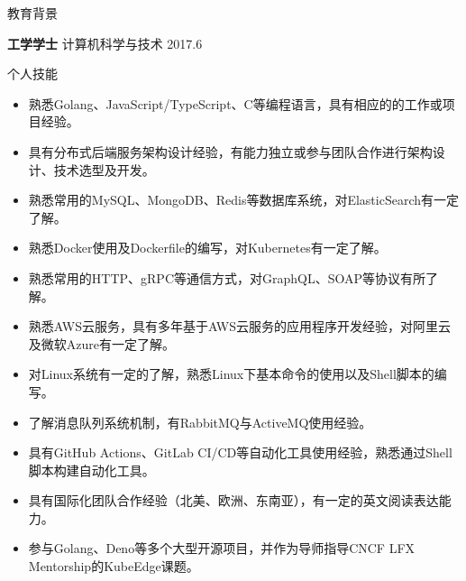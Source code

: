 \documentclass{resume} %
\begin{document}

\begin{rSection}{教育背景}

  {\bf 工学学士} 计算机科学与技术 \hfill {2017.6}

\end{rSection}

\begin{rSection}{个人技能}
  \begin{itemize}
    \itemsep -3pt {}
    \item 熟悉Golang、JavaScript/TypeScript、C等编程语言，具有相应的的工作或项目经验。
    \item 具有分布式后端服务架构设计经验，有能力独立或参与团队合作进行架构设计、技术选型及开发。
    \item 熟悉常用的MySQL、MongoDB、Redis等数据库系统，对ElasticSearch有一定了解。
    \item 熟悉Docker使用及Dockerfile的编写，对Kubernetes有一定了解。
    \item 熟悉常用的HTTP、gRPC等通信方式，对GraphQL、SOAP等协议有所了解。
    \item 熟悉AWS云服务，具有多年基于AWS云服务的应用程序开发经验，对阿里云及微软Azure有一定了解。
    \item 对Linux系统有一定的了解，熟悉Linux下基本命令的使用以及Shell脚本的编写。
    \item 了解消息队列系统机制，有RabbitMQ与ActiveMQ使用经验。
    \item 具有GitHub Actions、GitLab CI/CD等自动化工具使用经验，熟悉通过Shell脚本构建自动化工具。
    \item 具有国际化团队合作经验（北美、欧洲、东南亚），有一定的英文阅读表达能力。
    \item 参与Golang、Deno等多个大型开源项目，并作为导师指导CNCF LFX Mentorship的KubeEdge课题。
  \end{itemize}
\end{rSection}
\end{document}
